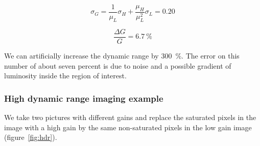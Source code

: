 \documentclass[a4paper, 12pt]{paper}
\begin{document}
\begin{equation}
    \sigma_G = \frac{1}{\mu_L} \sigma_H + \frac{\mu_H}{\mu_L^2} \sigma_L = 0.20
    \label{equ:dyn_range_factor_err}
\end{equation}

\begin{equation}
    \frac{\Delta G}{G} = \SI{6.7}{\percent}
    \label{equ:dyn_range_factor_err_percent}
\end{equation}

We can artificially increase the dynamic range by \SI{300}{\percent}.
The error on this number of about seven percent is due to noise and a possible gradient of luminosity inside the region of interest.

\subsubsection{High dynamic range imaging example}

We take two pictures with different gains and replace the saturated pixels in the image with a high gain by the same non-saturated pixels in the low gain image (figure~\ref{fig:hdr}).
\end{document}
